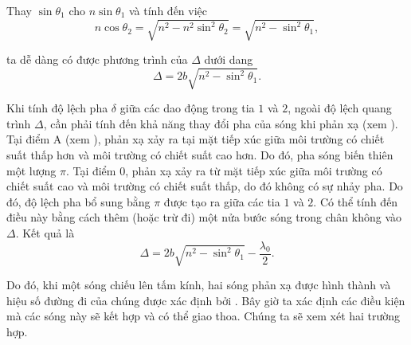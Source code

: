 \noindent
Thay $\sin\theta_1$ cho $n\sin\theta_1$ và tính đến việc
\begin{equation*}
    n \cos\theta_2 = \sqrt{n^2 - n^2 \sin^2\theta_2} = \sqrt{n^2 - \sin^2\theta_1},
\end{equation*}

\noindent
ta dễ dàng có được phương trình của $\Delta$ dưới dang
\begin{equation}\label{eq:17_33}
    \Delta = 2b \sqrt{n^2 - \sin^2\theta_1}.
\end{equation}

Khi tính độ lệch pha $\delta$ giữa các dao động trong tia $1$ và $2$, ngoài độ lệch quang trình $\Delta$, cần phải tính đến khả năng thay đổi pha của sóng khi phản xạ (xem ).
Tại điểm A (xem ), phản xạ xảy ra tại mặt tiếp xúc giữa môi trường có chiết suất thấp hơn và môi trường có chiết suất cao hơn.
Do đó, pha sóng biến thiên một lượng $\pi$.
Tại điểm $0$, phản xạ xảy ra từ mặt tiếp xúc giữa môi trường có chiết suất cao và môi trường có chiết suất thấp, do đó không có sự nhảy pha.
Do đó, độ lệch pha bổ sung bằng $\pi$ được tạo ra giữa các tia $1$ và $2$.
Có thể tính đến điều này bằng cách thêm (hoặc trừ đi) một nửa bước sóng trong chân không vào $\Delta$. Kết quả là
\begin{equation}\label{eq:17_34}
    \Delta = 2 b \sqrt{n^2 - \sin^2\theta_1} - \frac{\lambda_0}{2}.
\end{equation}

Do đó, khi một sóng chiếu lên tấm kính, hai sóng phản xạ được hình thành và hiệu số đường đi của chúng được xác định bởi .
Bây giờ ta xác định các điều kiện mà các sóng này sẽ kết hợp và có thể giao thoa.
Chúng ta sẽ xem xét hai trường hợp.

